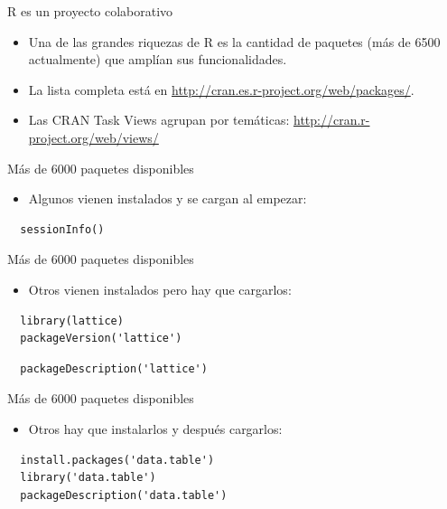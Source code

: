 \documentclass[xcolor={usenames,svgnames,dvipsnames}]{beamer}
\begin{document}
\begin{frame}[label=sec-1-1-6]{R es un proyecto colaborativo}
\begin{itemize}
\item Una de las grandes riquezas de R es la cantidad de paquetes (más
de 6500 actualmente) que amplían sus funcionalidades.
\item La lista completa está en \url{http://cran.es.r-project.org/web/packages/}.
\item Las CRAN Task Views agrupan por temáticas:
\url{http://cran.r-project.org/web/views/}
\end{itemize}
\end{frame}

\begin{frame}[fragile,label=sec-1-1-7]{Más de 6000 paquetes disponibles}
 \begin{itemize}
\item Algunos vienen instalados y se cargan al empezar:
\end{itemize}
\lstset{language=R,label= ,caption= ,numbers=none}
\begin{lstlisting}
  sessionInfo()
\end{lstlisting}
\end{frame}
\begin{frame}[fragile,label=sec-1-1-8]{Más de 6000 paquetes disponibles}
 \begin{itemize}
\item Otros vienen instalados pero hay que cargarlos:
\end{itemize}
\lstset{language=R,label= ,caption= ,numbers=none}
\begin{lstlisting}
  library(lattice)
  packageVersion('lattice')
\end{lstlisting}
\lstset{language=R,label= ,caption= ,numbers=none}
\begin{lstlisting}
  packageDescription('lattice')
\end{lstlisting}
\end{frame}

\begin{frame}[fragile,label=sec-1-1-9]{Más de 6000 paquetes disponibles}
 \begin{itemize}
\item Otros hay que instalarlos y después cargarlos:
\end{itemize}
\lstset{language=R,label= ,caption= ,numbers=none}
\begin{lstlisting}
  install.packages('data.table')
  library('data.table')
  packageDescription('data.table')
\end{lstlisting}
\end{frame}
\end{document}
